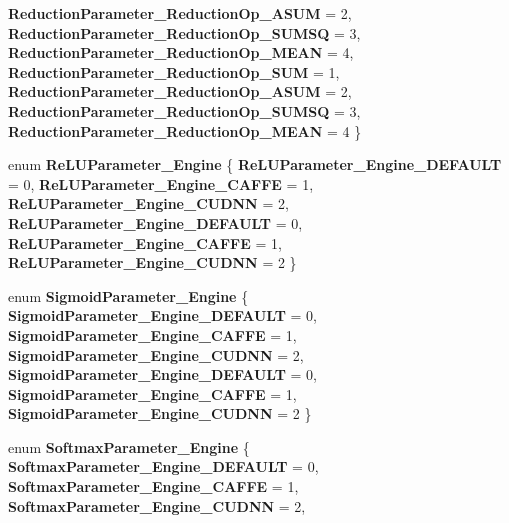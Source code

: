 \begin{DoxyCompactItemize}
{\bfseries Reduction\+Parameter\+\_\+\+Reduction\+Op\+\_\+\+A\+S\+UM} = 2, 
{\bfseries Reduction\+Parameter\+\_\+\+Reduction\+Op\+\_\+\+S\+U\+M\+SQ} = 3, 
{\bfseries Reduction\+Parameter\+\_\+\+Reduction\+Op\+\_\+\+M\+E\+AN} = 4, 
\newline
{\bfseries Reduction\+Parameter\+\_\+\+Reduction\+Op\+\_\+\+S\+UM} = 1, 
{\bfseries Reduction\+Parameter\+\_\+\+Reduction\+Op\+\_\+\+A\+S\+UM} = 2, 
{\bfseries Reduction\+Parameter\+\_\+\+Reduction\+Op\+\_\+\+S\+U\+M\+SQ} = 3, 
{\bfseries Reduction\+Parameter\+\_\+\+Reduction\+Op\+\_\+\+M\+E\+AN} = 4
 \}
\item 
\mbox{\label{namespacecaffe_afcc40053b14575a29d9425fcfde3514b}} 
enum {\bfseries Re\+L\+U\+Parameter\+\_\+\+Engine} \{ \newline
{\bfseries Re\+L\+U\+Parameter\+\_\+\+Engine\+\_\+\+D\+E\+F\+A\+U\+LT} = 0, 
{\bfseries Re\+L\+U\+Parameter\+\_\+\+Engine\+\_\+\+C\+A\+F\+FE} = 1, 
{\bfseries Re\+L\+U\+Parameter\+\_\+\+Engine\+\_\+\+C\+U\+D\+NN} = 2, 
{\bfseries Re\+L\+U\+Parameter\+\_\+\+Engine\+\_\+\+D\+E\+F\+A\+U\+LT} = 0, 
\newline
{\bfseries Re\+L\+U\+Parameter\+\_\+\+Engine\+\_\+\+C\+A\+F\+FE} = 1, 
{\bfseries Re\+L\+U\+Parameter\+\_\+\+Engine\+\_\+\+C\+U\+D\+NN} = 2
 \}
\item 
\mbox{\label{namespacecaffe_ac4c918387f1912b2fec8c7790ce83227}} 
enum {\bfseries Sigmoid\+Parameter\+\_\+\+Engine} \{ \newline
{\bfseries Sigmoid\+Parameter\+\_\+\+Engine\+\_\+\+D\+E\+F\+A\+U\+LT} = 0, 
{\bfseries Sigmoid\+Parameter\+\_\+\+Engine\+\_\+\+C\+A\+F\+FE} = 1, 
{\bfseries Sigmoid\+Parameter\+\_\+\+Engine\+\_\+\+C\+U\+D\+NN} = 2, 
{\bfseries Sigmoid\+Parameter\+\_\+\+Engine\+\_\+\+D\+E\+F\+A\+U\+LT} = 0, 
\newline
{\bfseries Sigmoid\+Parameter\+\_\+\+Engine\+\_\+\+C\+A\+F\+FE} = 1, 
{\bfseries Sigmoid\+Parameter\+\_\+\+Engine\+\_\+\+C\+U\+D\+NN} = 2
 \}
\item 
\mbox{\label{namespacecaffe_a3f6422b4fe63e2334d357cbbf9f4642a}} 
enum {\bfseries Softmax\+Parameter\+\_\+\+Engine} \{ \newline
{\bfseries Softmax\+Parameter\+\_\+\+Engine\+\_\+\+D\+E\+F\+A\+U\+LT} = 0, 
{\bfseries Softmax\+Parameter\+\_\+\+Engine\+\_\+\+C\+A\+F\+FE} = 1, 
{\bfseries Softmax\+Parameter\+\_\+\+Engine\+\_\+\+C\+U\+D\+NN} = 2, 

\end{DoxyCompactItemize}
